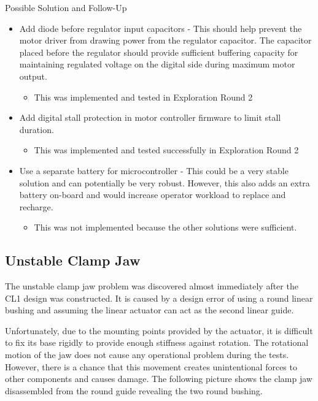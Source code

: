 Possible Solution and Follow-Up
\begin{itemize}
    \item Add diode before regulator input capacitors - This should help prevent the motor driver from drawing power from the regulator capacitor. The capacitor placed before the regulator should provide sufficient buffering capacity for maintaining regulated voltage on the digital side during maximum motor output.
    \begin{itemize}
        \item This was implemented and tested in Exploration Round 2 
    \end{itemize}
    \item Add digital stall protection in motor controller firmware to limit stall duration. 
    \begin{itemize}
        \item This was implemented and tested successfully in Exploration Round 2 
    \end{itemize}
    \item Use a separate battery for microcontroller - This could be a very stable solution and can potentially be very robust. However, this also adds an extra battery on-board and would increase operator workload to replace and recharge. 
    \begin{itemize}
        \item This was not implemented because the other solutions were sufficient.
    \end{itemize}
\end{itemize}

\subsection{Unstable Clamp Jaw}
\label{subsection:exploration_1_unstable_clamp_jaw}

The unstable clamp jaw problem was discovered almost immediately after the CL1 design was constructed. It is caused by a design error of using a round linear bushing and assuming the linear actuator can act as the second linear guide. 

Unfortunately, due to the mounting points provided by the actuator, it is difficult to fix its base rigidly to provide enough stiffness against rotation. The rotational motion of the jaw does not cause any operational problem during the tests. However, there is a chance that this movement creates unintentional forces to other components and causes damage. The following picture shows the clamp jaw disassembled from the round guide revealing the two round bushing.


